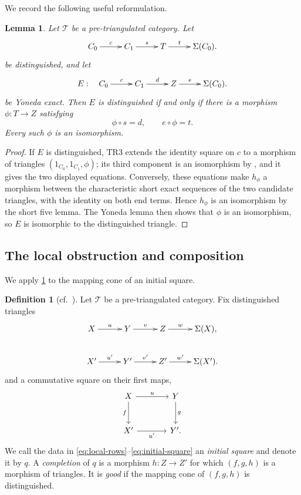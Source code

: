 \documentclass[a4paper,11pt,reqno]{amsart}
\newtheorem{lemma}[lemma]{Lemma}
\theoremstyle{definition}
\newtheorem{definition}[definition]{Definition}
\theoremstyle{plain}
\numberwithin{equation}{section}
\newcommand{\T}{\mathcal T}
\begin{document}
We record the following useful reformulation.

\begin{lemma}
\label{lem:two-arrow-recognition}
Let $\T$ be a pre-triangulated category.  Let
\begin{equation*}
\xymatrix@C=2.2pc{
C_0\ar[r]^-{c}&C_1\ar[r]^-{s}&T\ar[r]^-{t}&\Sigma(C_0).
}
\end{equation*}
be distinguished, and let
\begin{equation*}
\xymatrix@C=2.2pc{
 E:\quad C_0\ar[r]^-{c}&C_1\ar[r]^-{d}&Z\ar[r]^-{e}&\Sigma(C_0).
}
\end{equation*}
be Yoneda exact.  Then $E$ is distinguished if and only if there is a
morphism $\phi:T\to Z$ satisfying
\[
 \phi\circ s=d,
 \qquad
 e\circ\phi=t.
\]
Every such $\phi$ is an isomorphism.
\end{lemma}

\begin{proof}
If $E$ is distinguished, $\mathrm{TR3}$ extends the identity square on $c$
to a morphism of triangles $(1_{C_0},1_{C_1},\phi)$; its third component is
an isomorphism by \cite[Proposition~1.1.20]{Neeman2001}, and it gives the two
displayed equations.  Conversely, these equations make $h_\phi$ a morphism
between the characteristic short exact sequences of the two candidate
triangles,
with the identity on both end terms.  Hence $h_\phi$ is an isomorphism by
the short five lemma.  The Yoneda lemma then shows that $\phi$ is an
isomorphism, so $E$ is isomorphic to the distinguished triangle.
\end{proof}

\subsection{The local obstruction and composition}

We apply \cref{lem:two-arrow-recognition} to the mapping cone of an
initial square.

\begin{definition}[{\normalfont cf.~\cite[Definition~1.3.14]{Neeman2001}}]
\label{def:initial-square}
Let $\T$ be a pre-triangulated category.  Fix distinguished
triangles
\begin{equation}
\label{eq:local-rows}
\xymatrix@C=2.2pc{
 X\ar[r]^-{u}&Y\ar[r]^-{v}&Z\ar[r]^-{w}&\Sigma(X),\\
 X'\ar[r]^-{u'}&Y'\ar[r]^-{v'}&Z'\ar[r]^-{w'}&\Sigma(X').
}
\end{equation}
and a commutative square on their first maps,
\begin{equation}
\label{eq:initial-square}
\begin{tikzcd}[column sep=large,row sep=large]
X \arrow[r,"u"] \arrow[d,"f"'] & Y \arrow[d,"g"] \\
X'\arrow[r,"u'"'] &Y'.
\end{tikzcd}
\end{equation}
We call the data in \eqref{eq:local-rows}--\eqref{eq:initial-square} an
\emph{initial square} and denote it by $q$.  A \emph{completion} of $q$
is a morphism $h:Z\to Z'$ for which $(f,g,h)$ is a morphism of triangles.
It is \emph{good} if the mapping cone of $(f,g,h)$ is distinguished.
\end{definition}
\end{document}
